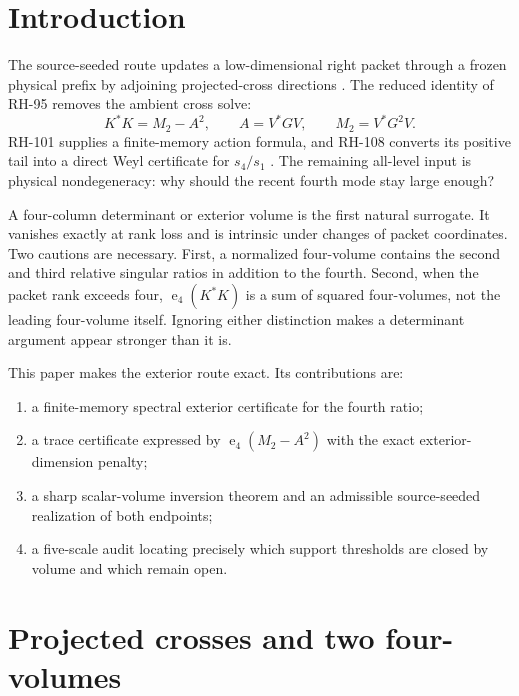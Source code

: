 \documentclass[11pt]{article}
\theoremstyle{definition}
\theoremstyle{remark}
\newcommand{\e}{\operatorname{e}}
\begin{document}
\section{Introduction}

The source-seeded route updates a low-dimensional right packet through a
frozen physical prefix by adjoining projected-cross directions
\citep{WangSourceSeeded2026,WangWeakMode2026}.  The reduced identity of RH-95
removes the ambient cross solve:
\begin{equation}
 K^*K=M_2-A^2,
 \qquad
 A=V^*GV,
 \qquad M_2=V^*G^2V.
 \label{eq:reduced-intro}
\end{equation}
RH-101 supplies a finite-memory action formula, and RH-108 converts its
positive tail into a direct Weyl certificate for $s_4/s_1$
\citep{WangReducedCross2026,WangFiniteMemory2026,WangFourthCross2026}.
The remaining all-level input is physical nondegeneracy: why should the
recent fourth mode stay large enough?

A four-column determinant or exterior volume is the first natural
surrogate.  It vanishes exactly at rank loss and is intrinsic under changes
of packet coordinates.  Two cautions are necessary.  First, a normalized
four-volume contains the second and third relative singular ratios in
addition to the fourth.  Second, when the packet rank exceeds four,
$\e_4(K^*K)$ is a sum of squared four-volumes, not the leading four-volume
itself.  Ignoring either distinction makes a determinant argument appear
stronger than it is.

This paper makes the exterior route exact.  Its contributions are:
\begin{enumerate}[leftmargin=2.2em]
 \item a finite-memory spectral exterior certificate for the fourth ratio;
 \item a trace certificate expressed by $\e_4(M_2-A^2)$ with the exact
       exterior-dimension penalty;
 \item a sharp scalar-volume inversion theorem and an admissible
       source-seeded realization of both endpoints;
 \item a five-scale audit locating precisely which support thresholds are
       closed by volume and which remain open.
\end{enumerate}

\section{Projected crosses and two four-volumes}
\label{sec:setting}
\end{document}
